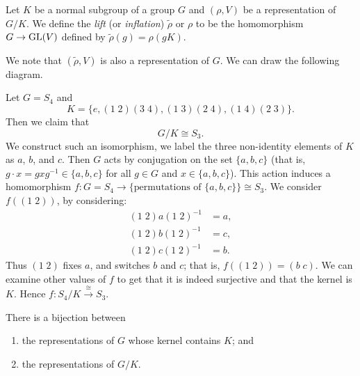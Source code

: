 \begin{definition}[Lift]
    Let $K$ be a normal subgroup of a group $G$ and $(\rho, V)$ be a representation of $G/K$. We define the \emph{lift} (or \emph{inflation}) $\tilde\rho$ or $\rho$ to be the homomorphism $G \to \operatorname{GL}(V)$ defined by $\tilde\rho(g) = \rho(gK)$.
\end{definition}

We note that $(\tilde\rho, V)$ is also a representation of $G$. We can draw the following diagram.

\begin{center}
\end{center}

\begin{example}
    Let $G = S_4$ and
    \[ K = \{e, (1\;2)(3\;4), (1\;3)(2\;4), (1\;4)(2\;3)\}. \]
    Then we claim that
    \[ G/K \cong S_3. \]
    We construct such an isomorphism, we label the three non-identity elements of $K$ as $a$, $b$, and $c$. Then $G$ acts by conjugation on the set $\{a,b,c\}$ (that is, $g \cdot x = gxg^{-1} \in \{a,b,c\}$ for all $g \in G$ and $x \in \{a,b,c\}$). This action induces a homomorphism $f: G = S_4 \to \{\text{permutations of $\{a,b,c\}$}\} \cong S_3$. We consider $f((1\;2))$, by considering:
    \begin{align*}
        (1\;2) a (1\;2)^{-1} & = a, \\
        (1\;2) b (1\;2)^{-1} & = c, \\
        (1\;2) c (1\;2)^{-1} & = b.
    \end{align*}
    Thus $(1\;2)$ fixes $a$, and switches $b$ and $c$; that is, $f((1\;2)) = (b\;c)$. We can examine other values of $f$ to get that it is indeed surjective and that the kernel is $K$. Hence $f: S_4/K \xrightarrow{\cong} S_3$.
\end{example}

\begin{lemma}
    There is a bijection between
    \begin{enumerate}
        \item the representations of $G$ whose kernel contains $K$; and
        \item the representations of $G/K$.
    \end{enumerate}
\end{lemma}

